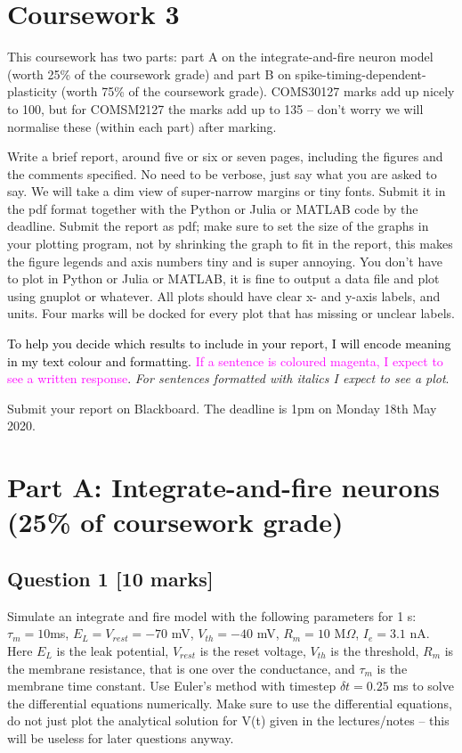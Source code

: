 \documentclass[12pt]{article}
\begin{document}
\section*{Coursework 3}
This coursework has two parts: part A on the integrate-and-fire neuron model (worth 25\% of the coursework grade) and part B on spike-timing-dependent-plasticity (worth 75\% of the coursework grade). COMS30127 marks add up nicely to 100, but for COMSM2127 the marks add up to 135 -- don't worry we will normalise these (within each part) after marking.

Write a brief report, around five or six or seven pages,
including the figures and the comments specified. No need to be verbose, just say what you are asked to say. We will take a dim view of super-narrow margins or tiny fonts. Submit it in the pdf format
together with the Python or Julia or MATLAB code by the deadline. Submit the report as pdf; make
sure to set the size of the graphs in your plotting program, not by
shrinking the graph to fit in the report, this makes the figure
legends and axis numbers tiny and is super annoying. You don't have to
plot in Python or Julia or MATLAB, it is fine to output a data file and plot
using gnuplot or whatever. All plots should have clear x- and y-axis labels, and units. Four marks will be docked for every plot that has missing or unclear labels.

\textcolor{black}{To help you decide which results to include in your
report, I will encode meaning in my text colour and formatting. }\textcolor{magenta}{If
a sentence is coloured magenta, I expect to see a written response}.
\emph{For sentences formatted with italics I expect to see a plot}.

Submit your report on Blackboard. The deadline is 1pm on Monday 18th May 2020.

\section*{Part A: Integrate-and-fire neurons (25\% of coursework grade)}

\subsection*{Question 1 [10 marks]}

Simulate an integrate and fire model with the following parameters for
1 s: $\tau_m = 10 $ms, $E_L = V_{rest} = -70$ mV, $V_{th} = -40$ mV, $R_m= 10$
M$\Omega$, $I_e = 3.1 $ nA. Here $E_L$ is the leak potential, $V_{rest}$ is the reset voltage,
$V_{th}$ is the threshold, $R_m$ is the membrane resistance, that is one
over the conductance, and $\tau_m$ is the membrane time constant. Use Euler's method with timestep $\delta t
= 0.25$ ms to solve the differential equations numerically. Make sure to use the differential equations, do not just plot the analytical solution for V(t) given in the lectures/notes -- this will be useless for later questions anyway.
\end{document}
